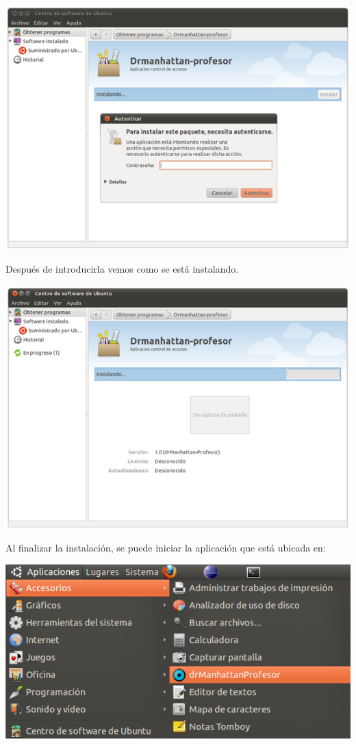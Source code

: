 \documentclass[11pt]{article}
\begin{document}
\begin{center}

    \includegraphics[width=.90\linewidth]{imagenes/inst2}

\end{center}


Después de introducirla vemos como se está instalando.

\begin{center}

    \includegraphics[width=.90\linewidth]{imagenes/inst3}

\end{center}

Al finalizar la instalación, se puede iniciar la aplicación que está ubicada en:

\begin{center}

    \includegraphics[width=.90\linewidth]{imagenes/inst4}

\end{center}
\end{document}
